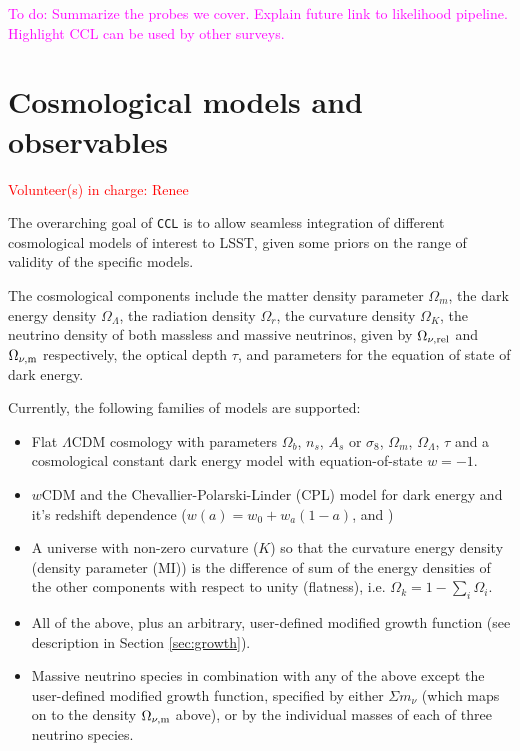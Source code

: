 \documentclass[\docopts]{\docclass}
\newcommand{\todo}[1]{\textcolor{magenta}{To do: #1}}
\newcommand{\vol}[1]{\textcolor{red}{Volunteer(s) in charge: #1}}
\newcommand{\ccl}{{\tt CCL}\xspace}
\begin{document}
\todo{Summarize the probes we cover. Explain future link to likelihood pipeline. Highlight CCL can be used by other surveys.}

\section{Cosmological models and observables}
\vol{Renee}

The overarching goal of \ccl is to allow seamless integration of different cosmological models of interest to LSST, given some priors on the range of validity of the specific models.

The cosmological components include the matter density parameter $\Omega_m$, the dark energy density $\Omega_\Lambda$, the radiation density $\Omega_r$, the curvature density $\Omega_K$,
the neutrino density of both massless and massive neutrinos, given by $\Omega_{\nu, {\rm rel}}$ and $\Omega_{\nu, {\rm m}}$ respectively, the optical depth $\tau$, and parameters for the equation of state of dark energy.

Currently, the following families of models are supported:
\begin{itemize}
 \item Flat $\Lambda$CDM cosmology with parameters $\Omega_b$, $n_s$, $A_s$ or $\sigma_8$, $\Omega_m$, $\Omega_\Lambda$, $\tau$ and a cosmological constant dark energy model with 
 equation-of-state $w=-1$.
 \item $w$CDM and the Chevallier-Polarski-Linder (CPL) model for dark energy and it's redshift dependence ($w(a) = w_0+w_a(1-a)$, \citealt{Chevallier01} and \citealt{Linder03})
 \item A universe with non-zero curvature ($K$) so that the curvature energy density (density parameter (MI)) is the difference of sum of the energy densities of the other components with respect to unity (flatness), i.e. $\Omega_k = 1- \sum_i \Omega_i$.
 \item All of the above, plus an arbitrary, user-defined modified growth function (see description in Section \ref{sec:growth}).
  \item Massive neutrino species in combination with any of the above except the user-defined modified growth function, specified by either $\Sigma m_\nu$ (which maps on to the density $\Omega_{\nu, {\rm m}}$ above), or by the individual masses of each of three neutrino species.
\end{itemize}
\end{document}
